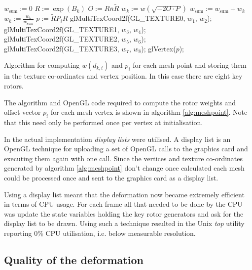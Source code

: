 \begin{fancyalg}
\begin{algorithmic}[1]
\STATE $w_{\mathrm{sum}} := 0$
\STATE $R := \exp(B_k)$
\STATE $O := R\bar{n}\tilde{R}$
\STATE $w_k := w(\sqrt{-2 O \cdot P})$
\STATE $w_{\mathrm{sum}} := w_{\mathrm{sum}} + w_k$
\ENDFOR
{}
\STATE $w_k := \frac{w_k}{w_{\mathrm{sum}}}$
\ENDFOR
\STATE $p := \tilde{R}P_iR$
\STATE glMultiTexCoord2f(GL\_TEXTURE0, $w_1$, $w_2$);
\STATE glMultiTexCoord2f(GL\_TEXTURE1, $w_3$, $w_4$); 
\STATE glMultiTexCoord2f(GL\_TEXTURE2, $w_5$, $w_6$);
\STATE glMultiTexCoord2f(GL\_TEXTURE3, $w_7$, $w_8$);
\STATE glVertex($p$);
\end{algorithmic}
\caption{\label{alg:meshpoint}Algorithm for computing $w(d_{k,i})$ and $p_i$ for 
  each mesh point and storing them in the texture co-ordinates and vertex position.
  In this case there are eight key rotors.}
\end{fancyalg}

The algorithm and OpenGL code required to compute the rotor weights and offset-vector
$p_i$ for each mesh vertex is shown in algorithm \ref{alg:meshpoint}. Note that this
need only be performed once per vertex at initialisation.

In the actual implementation \emph{display lists} were utilised. A display list 
is an OpenGL technique for uploading a set of OpenGL calls to the graphics card
and executing them again with one call. Since the vertices and texture co-ordinates
generated by algorithm \ref{alg:meshpoint} don't change once calculated each mesh could
be processed once and sent to the graphics card as a display list.

Using a display list meant that the deformation now became extremely efficient in
terms of CPU usage. For each frame all that needed to be done by the CPU was update the
state variables holding the key rotor generators and ask for the display list to be drawn.
Using such a technique resulted in the Unix \emph{top} utility reporting 0\% CPU utilisation,
i.e. below measurable resolution.

\subsection{Quality of the deformation}

